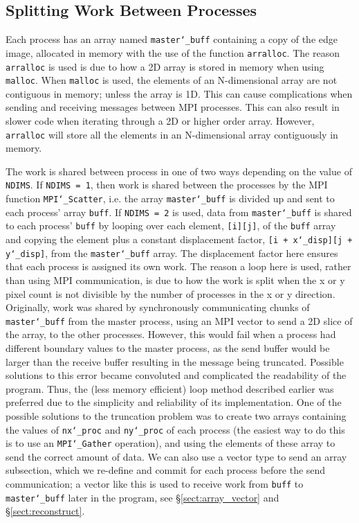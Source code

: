 \documentclass[11pt, a4paper]{article}
\begin{document}
		\subsection{Splitting Work Between Processes} \label{sect:deconstruct}
			Each process has an array named \texttt{master\char`_buff} containing a copy of the edge image, allocated in memory with the use of the function \texttt{arralloc}. The reason \texttt{arralloc} is used is due to how a 2D array is stored in memory when using \texttt{malloc}. When \texttt{malloc} is used, the elements of an N-dimensional array are not contiguous in memory; unless the array is 1D. This can cause complications when sending and receiving messages between MPI processes. This can also result in slower code when iterating through a 2D or higher order array. However, \texttt{arralloc} will store all the elements in an N-dimensional array contiguously in memory.
			
			The work is shared between process in one of two ways depending on the value of \texttt{NDIMS}. If \texttt{NDIMS = 1}, then work is shared between the processes by the MPI function \texttt{MPI\char`_Scatter}, i.e. the array \texttt{master\char`_buff} is divided up and sent to each process' array \texttt{buff}. If \texttt{NDIMS = 2} is used, data from \texttt{master\char`_buff} is shared to each process' \texttt{buff} by looping over each element, \texttt{[i][j]}, of the \texttt{buff} array and copying the element plus a constant displacement factor, \texttt{[i + x\char`_disp][j + y\char`_disp]}, from the \texttt{master\char`_buff} array. The displacement factor here ensures that each process is assigned its own work. The reason a loop here is used, rather than using MPI communication, is due to how the work is split when the x or y pixel count is not divisible by the number of processes in the x or y direction. Originally, work was shared by synchronously communicating chunks of \texttt{master\char`_buff} from the master process, using an MPI vector to send a 2D slice of the array, to the other processes. However, this would fail when a process had different boundary values to the master process, as the send buffer would be larger than the receive buffer resulting in the message being truncated. Possible solutions to this error became convoluted and complicated the readability of the program. Thus, the (less memory efficient) loop method described earlier was preferred due to the simplicity and reliability of its implementation.	One of the possible solutions to the truncation problem was to create two arrays containing the values of \texttt{nx\char`_proc} and \texttt{ny\char`_proc} of each process (the easiest way to do this is to use an \texttt{MPI\char`_Gather} operation), and using the elements of these array to send the correct amount of data. We can also use a vector type to send an array subsection, which we re-define and commit for each process before the send communication; a vector like this is used to receive work from \texttt{buff} to \texttt{master\char`_buff} later in the program, see \S\ref{sect:array_vector} and \S\ref{sect:reconstruct}.
			
\end{document}

